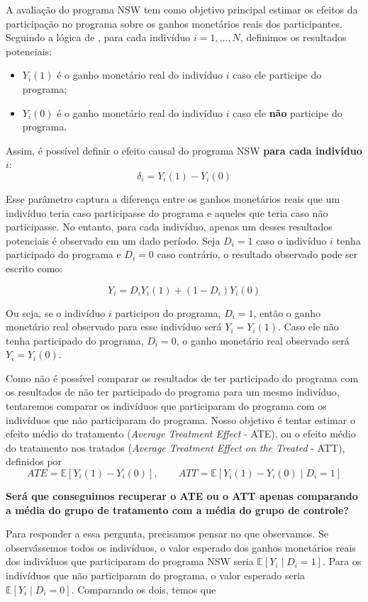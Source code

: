 A avaliação do programa NSW tem como objetivo principal estimar os efeitos da participação no programa sobre os ganhos monetários reais dos participantes. Seguindo a lógica de \cite{imbensrubin2015}, para cada indivíduo $i = 1,\dots,N$, definimos os resultados potenciais:

\begin{itemize}
    \item $Y_i(1)$ é o ganho monetário real do indivíduo $i$ caso ele participe do programa;
    \item $Y_i(0)$ é o ganho monetário real do indivíduo $i$ caso ele \textbf{não} participe do programa.
\end{itemize}

Assim, é possível definir o efeito causal do programa NSW \textbf{para cada indivíduo $i$}:
$$ \delta_i = Y_i(1) - Y_i(0)$$

Esse parâmetro captura a diferença entre os ganhos monetários reais que um indivíduo teria caso participasse do programa e aqueles que teria caso não participasse. No entanto, para cada indivíduo, apenas um desses resultados potenciais é observado em um dado período. Seja $D_i = 1$ caso o indivíduo $i$ tenha participado do programa e $D_i = 0$ caso contrário, o resultado observado pode ser escrito como:

$$
Y_i = D_i Y_i(1) + (1 - D_i) Y_i(0)
$$

Ou seja, se o indivíduo $i$ participou do programa, $D_i = 1$, então o ganho monetário real observado para esse indivíduo será $Y_i = Y_i(1)$. Caso ele não tenha participado do programa, $D_i = 0$, o ganho monetário real observado será $Y_i = Y_i(0)$.

Como não é possível comparar os resultados de ter participado do programa com os resultados de não ter participado do programa para um mesmo indivíduo, tentaremos comparar os indivíduos que participaram do programa com os indivíduos que não participaram do programa. Nosso objetivo é tentar estimar o efeito médio do tratamento (\textit{Average Treatment Effect} - ATE), ou o efeito médio do tratamento nos tratados (\textit{Average Treatment Effect on the Treated} - ATT), definidos por
$$
ATE = \mathbb{E}[Y_i(1) - Y_i(0)], \qquad ATT = \mathbb{E}[Y_i(1) - Y_i(0) \mid D_i = 1]
$$

\textbf{Será que conseguimos recuperar o ATE ou o ATT apenas comparando a média do grupo de tratamento com a média do grupo de controle?} 

Para responder a essa pergunta, precisamos pensar no que observamos. Se observássemos todos os indivíduos, o valor esperado dos ganhos monetários reais dos indivíduos que participaram do programa NSW seria $\mathbb{E}[Y_i \mid D_i = 1]$. Para os indivíduos que não participaram do programa, o valor esperado seria $\mathbb{E}[Y_i \mid D_i = 0]$. Comparando os dois, temos que

